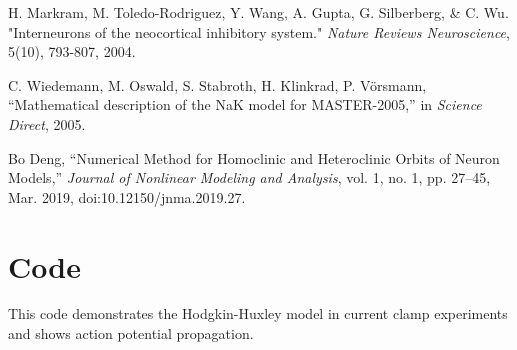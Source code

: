 \documentclass[12pt,a4paper]{report}
\begin{document}
\begin{thebibliography}{9}
    H. Markram, M. Toledo-Rodriguez, Y. Wang, A. Gupta, G. Silberberg, \& C. Wu. 
    "Interneurons of the neocortical inhibitory system." \textit{Nature Reviews Neuroscience}, 5(10), 793-807, 2004.

    C. Wiedemann, M. Oswald, S. Stabroth, H. Klinkrad, P. Vörsmann, 
    ``Mathematical description of the NaK model for MASTER-2005,'' in \textit{Science Direct}, 2005.

    Bo Deng,
    ``Numerical Method for Homoclinic and Heteroclinic Orbits of Neuron Models,'' 
    \textit{Journal of Nonlinear Modeling and Analysis}, 
    vol. 1, no. 1, pp. 27–45, Mar. 2019, doi:10.12150/jnma.2019.27.
    
\end{thebibliography}





\chapter{Code}

\appendix


This code demonstrates the Hodgkin-Huxley model in current clamp experiments and shows action potential propagation.
\end{document}
